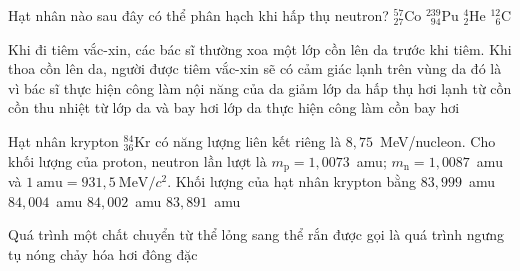 	\begin{ex}%
		Hạt nhân nào sau đây có thể phân hạch khi hấp thụ neutron?
		\choice
		{${}^{57}_{27}\text{Co}$}
		{\True ${}^{239}_{\phantom{2}94}\text{Pu}$}
		{${}^4_2\text{He}$}
		{${}^{12}_{\phantom{1}6}\text{C}$}
	\end{ex}

	\begin{ex}%
		Khi đi tiêm vắc-xin, các bác sĩ thường xoa một lớp cồn lên da trước khi tiêm. Khi thoa cồn lên da, người được tiêm vắc-xin sẽ có cảm giác lạnh trên vùng da đó là vì
		\choice
		{bác sĩ thực hiện công làm nội năng của da giảm}
		{lớp da hấp thụ hơi lạnh từ cồn}
		{\True cồn thu nhiệt từ lớp da và bay hơi}
		{lớp da thực hiện công làm cồn bay hơi}
	\end{ex}

	\begin{ex}%
		Hạt nhân krypton ${}^{84}_{36}\text{Kr}$ có năng lượng liên kết riêng là $8{,}75$~MeV/nucleon. Cho khối lượng của proton, neutron lần lượt là $m_\text{p}=1{,}0073$~amu; $m_\text{n}=1{,}0087$~amu và $1~\text{amu}=931{,}5~\text{MeV}/c^2$. Khối lượng của hạt nhân krypton bằng
		\choice
		{$83{,}999$~amu}
		{$84{,}004$~amu}
		{$84{,}002$~amu}
		{\True $83{,}891$~amu}
	\end{ex}

	\begin{ex}%
		Quá trình một chất chuyển từ thể lỏng sang thể rắn được gọi là quá trình
		\choice
		{ngưng tụ}
		{nóng chảy}
		{hóa hơi}
		{\True đông đặc}
	\end{ex}

